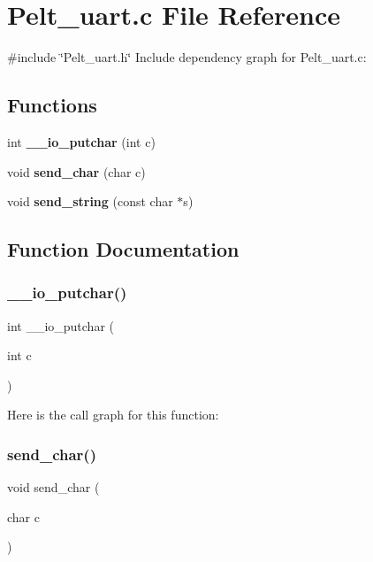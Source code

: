 \section{Pelt\+\_\+uart.\+c File Reference}
\label{_pelt__uart_8c}
{\ttfamily \#include \char`\"{}Pelt\+\_\+uart.\+h\char`\"{}}\newline
Include dependency graph for Pelt\+\_\+uart.\+c\+:
\subsection*{Functions}
\begin{DoxyCompactItemize}
\item 
int \textbf{ \+\_\+\+\_\+io\+\_\+putchar} (int c)
\item 
void \textbf{ send\+\_\+char} (char c)
\item 
void \textbf{ send\+\_\+string} (const char $\ast$s)
\end{DoxyCompactItemize}


\subsection{Function Documentation}
\mbox{\label{_pelt__uart_8c_aa0a607477e5bbc033c448373b90387b8}} 
\subsubsection{\+\_\+\+\_\+io\+\_\+putchar()}
{\footnotesize\ttfamily int \+\_\+\+\_\+io\+\_\+putchar (\begin{DoxyParamCaption}\item[{int}]{c }\end{DoxyParamCaption})}

Here is the call graph for this function\+:
\mbox{\label{_pelt__uart_8c_a4bf168796f84a0a0b725fdeb06f15c73}} 
\subsubsection{send\+\_\+char()}
{\footnotesize\ttfamily void send\+\_\+char (\begin{DoxyParamCaption}\item[{char}]{c }\end{DoxyParamCaption})}

